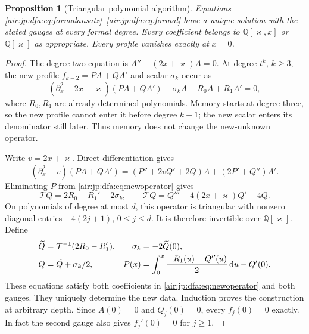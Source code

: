 \documentclass[11pt,letterpaper]{article}
\numberwithin{equation}{section}
\newtheorem{proposition}[theorem]{Proposition}
\theoremstyle{remark}
\begin{document}
\begin{proposition}[Triangular polynomial algorithm]\label{air:jp:dfa:prop:formal}
Equations \eqref{air:jp:dfa:eq:formalansatz}--\eqref{air:jp:dfa:eq:formal} have a unique solution with the stated gauges at every formal degree. Every coefficient belongs to $\mathbb Q[\varkappa,x]$ or $\mathbb Q[\varkappa]$ as appropriate. Every profile vanishes exactly at $x=0$.
\end{proposition}
\begin{proof}
The degree-two equation is $A''-(2x+\varkappa)A=0$. At degree $t^k$, $k\ge3$, the new profile $f_{k-2}=PA+QA'$ and scalar $\sigma_k$ occur as
\begin{equation}\label{air:jp:dfa:eq:newoperator}
 (\partial_x^2-2x-\varkappa)(PA+QA')-\sigma_k A+R_0A+R_1A'=0,
\end{equation}
where $R_0,R_1$ are already determined polynomials. Memory starts at degree three, so the new profile cannot enter it before degree $k+1$; the new scalar enters its denominator still later. Thus memory does not change the new-unknown operator.

Write $v=2x+\varkappa$. Direct differentiation gives
\[
 (\partial_x^2-v)(PA+QA')=(P''+2vQ'+2Q)A+(2P'+Q'')A'.
\]
Eliminating $P$ from \eqref{air:jp:dfa:eq:newoperator} gives
\begin{equation}\label{air:jp:dfa:eq:triangular}
 \mathcal TQ=2R_0-R_1'-2\sigma_k,\qquad
 \mathcal TQ=Q'''-4(2x+\varkappa)Q'-4Q.
\end{equation}
On polynomials of degree at most $d$, this operator is triangular with nonzero diagonal entries $-4(2j+1)$, $0\le j\le d$. It is therefore invertible over $\mathbb Q[\varkappa]$. Define
\begin{align}
 \widetilde Q&=\mathcal T^{-1}(2R_0-R_1'),&
 \sigma_k&=-2\widetilde Q(0),\notag\\
 Q&=\widetilde Q+\sigma_k/2,&
 P(x)&=\int_0^x\frac{-R_1(u)-Q''(u)}2\,\mathrm d u-Q'(0).\label{air:jp:dfa:eq:solver}
\end{align}
These equations satisfy both coefficients in \eqref{air:jp:dfa:eq:newoperator} and both gauges. They uniquely determine the new data. Induction proves the construction at arbitrary depth. Since $A(0)=0$ and $Q_j(0)=0$, every $f_j(0)=0$ exactly. In fact the second gauge also gives $f_j'(0)=0$ for $j\ge1$.
\end{proof}
\end{document}
